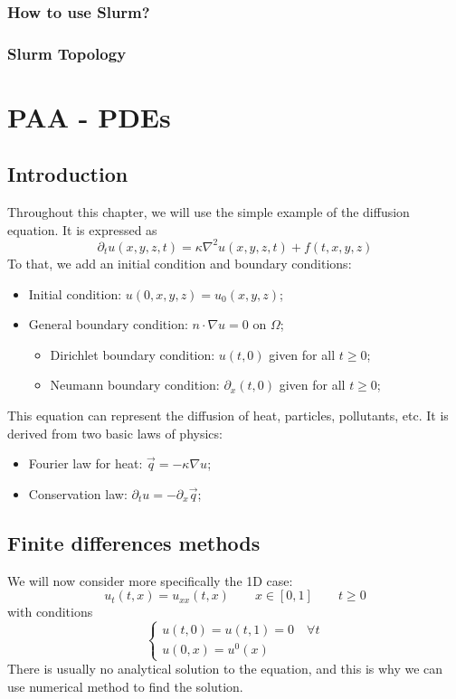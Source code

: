 \documentclass[12pt, openany]{report}
\theoremstyle{definition}
\begin{document}
\subsection{How to use Slurm?}
\subsection{Slurm Topology}

\chapter{PAA - PDEs}
\section{Introduction}
Throughout this chapter, we will use the simple example of the diffusion equation. It is expressed as 
\begin{equation}
	\partial_t u(x,y,z,t) = \kappa \nabla^2 u(x,y,z,t) + f(t,x,y,z)
\end{equation}
To that, we add an initial condition and boundary conditions:
\begin{itemize}
	\item Initial condition: $u(0,x,y,z) = u_0(x,y,z)$;
	\item General boundary condition: $ n\cdot \nabla u=0$ on $\Omega$;
	\begin{itemize}
		\item Dirichlet boundary condition: $u(t,0)$ given for all $t\ge0$;
		\item Neumann boundary condition: $\partial_x(t,0)$ given for all $t\ge0$;
	\end{itemize}
\end{itemize}
This equation can represent the diffusion of heat, particles, pollutants, etc. It is derived from two basic laws of physics:
\begin{itemize}
	\item Fourier law for heat: $\vec q=-\kappa \nabla u$;
	\item Conservation law: $\partial_t u = -\partial_x \vec q$;
\end{itemize}
\section{Finite differences methods}
We will now consider more specifically the 1D case:
\begin{equation}
	u_t(t,x)=u_{xx}(t,x) \qquad x\in [0,1]\qquad t\ge 0
\end{equation}
with conditions 
\begin{equation}
	\begin{cases}
		u(t,0)=u(t,1) = 0 \quad \forall t\\
		u(0,x) = u^0(x)
	\end{cases}
\end{equation}
There is usually no analytical solution to the equation, and this is why we can use numerical method to find the solution. 
\end{document}
